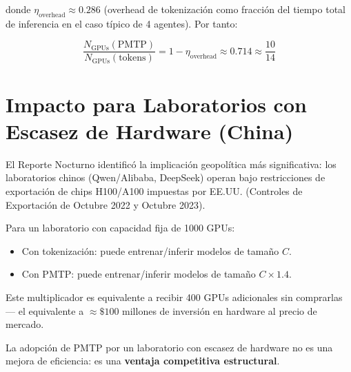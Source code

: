 donde $\eta_{\text{overhead}} \approx 0.286$ (overhead de tokenización como fracción
del tiempo total de inferencia en el caso típico de 4 agentes). Por tanto:

\begin{equation}
\frac{N_{\text{GPUs}}(\text{PMTP})}{N_{\text{GPUs}}(\text{tokens})} = 1 - \eta_{\text{overhead}} \approx 0.714 \approx \frac{10}{14}
\end{equation}

\section{Impacto para Laboratorios con Escasez de Hardware (China)}

El Reporte Nocturno identificó la implicación geopolítica más significativa:
los laboratorios chinos (Qwen/Alibaba, DeepSeek) operan bajo restricciones
de exportación de chips H100/A100 impuestas por EE.UU. (Controles de Exportación
de Octubre 2022 y Octubre 2023).

Para un laboratorio con capacidad fija de 1000 GPUs:
\begin{itemize}
\item Con tokenización: puede entrenar/inferir modelos de tamaño $C$.
\item Con PMTP: puede entrenar/inferir modelos de tamaño $C \times 1.4$.
\end{itemize}

Este multiplicador es equivalente a recibir 400 GPUs adicionales sin comprarlas ---
el equivalente a $\approx \$100$ millones de inversión en hardware al precio de mercado.

La adopción de PMTP por un laboratorio con escasez de hardware no es una mejora
de eficiencia: es una \textbf{ventaja competitiva estructural}.
